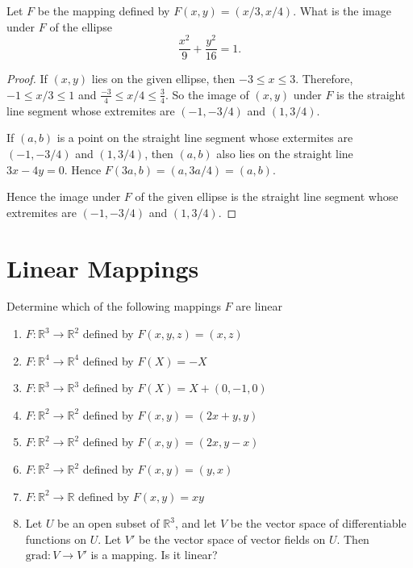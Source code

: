 \begin{exercise}
    Let $F$ be the mapping defined by $F(x, y) = (x/3, x/4)$. What is the image under $F$ of the ellipse
    \[
        \frac{x^{2}}{9} + \frac{y^{2}}{16} = 1.
    \]
\end{exercise}

\begin{proof}
    If $(x, y)$ lies on the given ellipse, then $-3 \le x \le 3$. Therefore, $-1\le x/3 \le 1$ and $\frac{-3}{4} \le x/4 \le \frac{3}{4}$. So the image of $(x, y)$ under $F$ is the straight line segment whose extremites are $(-1, -3/4)$ and $(1, 3/4)$.

    If $(a, b)$ is a point on the straight line segment whose extermites are $(-1, -3/4)$ and $(1, 3/4)$, then $(a, b)$ also lies on the straight line $3x - 4y = 0$. Hence $F(3a, b) = (a, 3a/4) = (a, b)$.

    Hence the image under $F$ of the given ellipse is the straight line segment whose extremites are $(-1, -3/4)$ and $(1, 3/4)$.
\end{proof}

\section{Linear Mappings}
\setcounter{exercise}{0}

\begin{exercise}
    Determine which of the following mappings $F$ are linear
    \begin{enumerate}[label={(\alph*)}]
        \item $F: \mathbb{R}^{3} \to \mathbb{R}^{2}$ defined by $F(x, y, z) = (x, z)$
        \item $F: \mathbb{R}^{4} \to \mathbb{R}^{4}$ defined by $F(X) = -X$
        \item $F: \mathbb{R}^{3} \to \mathbb{R}^{3}$ defined by $F(X) = X + (0, -1, 0)$
        \item $F: \mathbb{R}^{2} \to \mathbb{R}^{2}$ defined by $F(x, y) = (2x + y, y)$
        \item $F: \mathbb{R}^{2} \to \mathbb{R}^{2}$ defined by $F(x, y) = (2x, y - x)$
        \item $F: \mathbb{R}^{2} \to \mathbb{R}^{2}$ defined by $F(x, y) = (y, x)$
        \item $F: \mathbb{R}^{2} \to \mathbb{R}$ defined by $F(x, y) = xy$
        \item Let $U$ be an open subset of $\mathbb{R}^{3}$, and let $V$ be the vector space of differentiable functions on $U$. Let $V'$ be the vector space of vector fields on $U$. Then $\text{grad}: V \to V'$ is a mapping. Is it linear?
    \end{enumerate}
\end{exercise}

